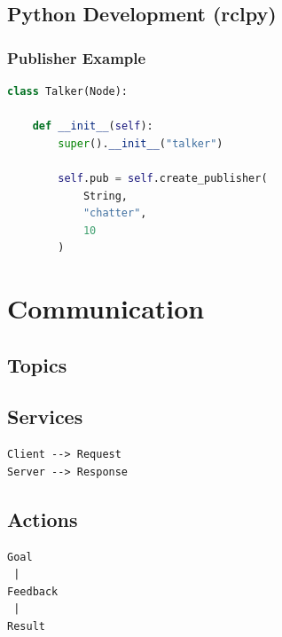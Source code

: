 \documentclass[11pt,oneside]{book}
\begin{document}
\chapter{Python Development (rclpy)}

\section{Publisher Example}

\begin{lstlisting}[language=Python]
class Talker(Node):

    def __init__(self):
        super().__init__("talker")

        self.pub = self.create_publisher(
            String,
            "chatter",
            10
        )
\end{lstlisting}

\part{Communication}

\chapter{Topics}

\begin{center}
\end{center}

\chapter{Services}

\begin{verbatim}
Client --> Request
Server --> Response
\end{verbatim}

\chapter{Actions}

\begin{verbatim}
Goal
 |
Feedback
 |
Result
\end{verbatim}
\end{document}
